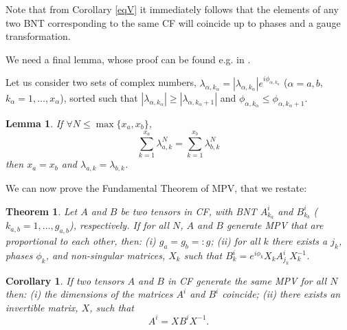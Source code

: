 \documentclass{elsarticle}
\newcommand{\be}{\begin{equation}}
\newcommand{\ee}{\end{equation}}
\newtheorem*{thm*}{Theorem}
\newtheorem*{cor*}{Corollary}
\newtheorem{lem}[thm]{Lemma}
\begin{document}
Note that from Corollary \ref{eqV} it immediately follows that the elements of any two BNT corresponding to the same CF will coincide up to phases and a gauge transformation.

We need a final lemma, whose proof can be found e.g. in \cite{Gemma}.

Let us consider two sets of complex numbers, $\lambda_{\alpha,k_\alpha}=|\lambda_{\alpha,k_\alpha}|e ^{i \phi_{\alpha,k_\alpha}}$ ($\alpha=a,b$, $k_\alpha=1,\ldots,x_\alpha$), sorted such that $|\lambda_{\alpha,k_\alpha}|\ge |\lambda_{\alpha,k_\alpha+1}|$ and
$\phi_{\alpha,k_\alpha}\le \phi_{\alpha,k_\alpha+1}$.

\begin{lem}
\label{Lem:app_simple}
If $\forall N\le \max\{x_a,x_b\}$,
 \be
 \label{eq:app_aux}
 \sum_{k=1}^{x_a} \lambda_{a,k}^N = \sum_{k=1}^{x_b} \lambda_{b,k}^N
 \ee
then  $x_a=x_b$ and $\lambda_{a,k}=\lambda_{b,k}$.
\end{lem}

We can now prove the Fundamental Theorem of MPV, that we restate:

\begin{thm*}
\label{thm1}
Let $A$ and $B$ be two tensors in CF, with BNT $A^i_{k_a}$ and $B^i_{k_b}$ ($k_{a,b}=1,\dots,g_{a,b}$), respectively. If for all $N$, $A$ and $B$ generate MPV that are proportional to each other, then: (i) $g_a=g_b=:g$; (ii) for all $k$ there exists a $j_k$, phases $\phi_{k}$, and non-singular matrices, $X_{k}$ such that $B^i_{k}=e^{i\phi_{k}}X_{k}A^i_{j_k}X_{k}^{-1}$.
\end{thm*}

\begin{cor*}
\label{II_cor2}
If two tensors $A$ and $B$ in CF generate the same MPV for all $N$ then: (i) the dimensions of the matrices $A^i$ and $B^i$ coincide; (ii) there exists an invertible matrix, $X$, such that
 \be
 \label{eq:II_auxcor}
 A^i = X B^i X^{-1}.
 \ee
\end{cor*}
\end{document}
